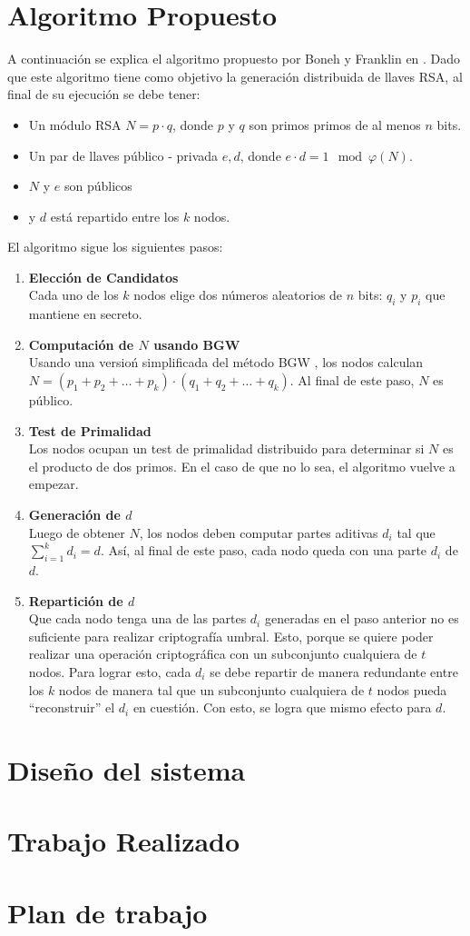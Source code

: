 \documentclass[12pt,letterpaper]{article}
\begin{document}
\section{Algoritmo Propuesto}
A continuación se explica el algoritmo propuesto por Boneh y Franklin en \cite{bonehfranklin01}.
Dado que este algoritmo tiene como objetivo la generación distribuida de llaves RSA, al final de su ejecución se debe tener:
\begin{itemize}
\item Un módulo RSA $N = p \cdot q$, donde $p$ y $q$ son primos primos de al menos $n$ bits.
\item Un par de llaves público - privada $e, d$, donde $e \cdot d = 1 \mod \varphi(N)$.
\item $N$ y $e$ son públicos
\item y $d$ está repartido entre los $k$ nodos.
\end{itemize}
El algoritmo sigue los siguientes pasos:
\begin{enumerate}[label=\textbf{\arabic*})]
\item \textbf{Elección de Candidatos}
\\
Cada uno de los $k$ nodos elige dos números aleatorios de $n$ bits: $q_i$ y $p_i$ que mantiene en secreto. 
\item \textbf{Computación de $N$ usando BGW}
\\
Usando una versioń simplificada del método BGW \cite{BGW}, los nodos calculan $N = (p_1 + p_2 + \ldots + p_k)\cdot(q_1 + q_2 + \ldots + q_k)$. Al final de este paso, $N$ es público.
\item \textbf{Test de Primalidad}
\\
Los nodos ocupan un test de primalidad distribuido para determinar si $N$ es el producto de dos primos. En el caso de que no lo sea, el algoritmo vuelve a empezar.  
\item \textbf{Generación de $d$} 
\\Luego de obtener $N$, los nodos deben computar partes aditivas $d_i$ tal que $\sum_{i=1}^k d_i = d$. Así, al final de este paso, cada nodo queda con una parte $d_i$ de $d$. 
\item \textbf{Repartición de $d$}
\\
Que cada nodo tenga una de las partes $d_i$ generadas en el paso anterior no es suficiente para realizar criptografía umbral. Esto, porque se quiere poder realizar una operación criptográfica con un subconjunto cualquiera de $t$ nodos. Para lograr esto, cada $d_i$ se debe repartir de manera redundante entre los $k$ nodos de manera tal que un subconjunto cualquiera de $t$ nodos pueda ``reconstruir'' el $d_i$ en cuestión. Con esto, se logra que mismo efecto para $d$.  
\end{enumerate}

\section{Diseño del sistema}

\section{Trabajo Realizado}


\section{Plan de trabajo}



 
\end{document}
